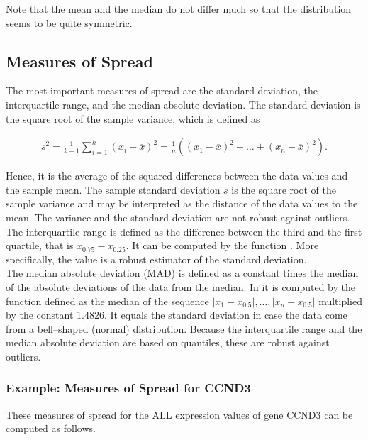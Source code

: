 \documentclass{article}\usepackage[]{graphicx}\usepackage[usenames,dvipsnames]{color}
\begin{document}
Note that the mean and the median do not differ much so that the distribution 
seems to be quite symmetric.

\subsection{Measures of Spread}
The most important measures of spread are the standard deviation, the interquartile range, 
and the median absolute deviation. The standard deviation
is the square root of the sample variance, which is defined as


\begin{gather*}
s^2 =\frac{1}{k - 1} \sum_{i=1}^k (x_{i} - \overline x)^{2}
= \frac{1}{n} \left( (x_{1} - \overline x)^{2} + \dotso + (x_{n} - \overline x)^{2}\right).
\end{gather*}

Hence, it is the average of the squared differences between the data values
and the sample mean. The sample standard deviation $s$ is the square root
of the sample variance and may be interpreted as the distance of the data
values to the mean. The variance and the standard deviation are not robust
against outliers. \\

The interquartile range is defined as the difference between the third and
the first quartile, that is $x_{0.75} - x_{0.25}$. It can be computed by the function
. More specifically, the value 
 is a robust estimator of
the standard deviation.  \\

The median absolute deviation (MAD) is defined as
a constant times the median of the absolute deviations of the data from the
median. In  it is computed by the
function  defined as the median of the sequence
$|x_1  - x_{0.5} |, \dotsc, |x_n - x_{0.5} |$
multiplied by the constant 1.4826. It equals the standard deviation in case
the data come from a bell--shaped (normal) distribution.
Because the interquartile range and the median absolute deviation are based
on quantiles, these are robust against outliers.


\subsubsection*{Example: Measures of Spread for CCND3} These measures of spread 
for the ALL expression values of gene CCND3 can be computed as follows.
\end{document}
